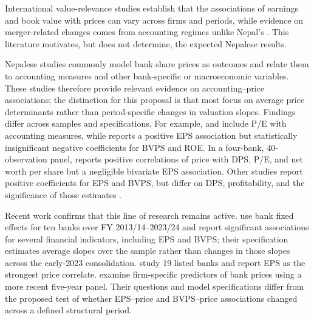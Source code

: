 International value-relevance studies establish that the associations of earnings and book value with prices can vary across firms and periods, while evidence on merger-related changes comes from accounting regimes unlike Nepal's \citep{collins1997,kwon2020}. This literature motivates, but does not determine, the expected Nepalese results.

Nepalese studies commonly model bank share prices as outcomes and relate them to accounting measures and other bank-specific or macroeconomic variables. These studies therefore provide relevant evidence on accounting--price associations; the distinction for this proposal is that most focus on average price determinants rather than period-specific changes in valuation slopes. Findings differ across samples and specifications. For example, \citet{bhattarai2014} and \citet{chhetri2023} include P/E with accounting measures, while \citet{niroula2021} reports a positive EPS association but statistically insignificant negative coefficients for BVPS and ROE. In a four-bank, 40-observation panel, \citet{giri2024} reports positive correlations of price with DPS, P/E, and net worth per share but a negligible bivariate EPS association. Other studies report positive coefficients for EPS and BVPS, but differ on DPS, profitability, and the significance of those estimates \citep{joshi2023,lamsal2024,gurung2024,pant2024,chaudhari2025}.

Recent work confirms that this line of research remains active. \citet{gurungdahal2025} use bank fixed effects for ten banks over FY 2013/14--2023/24 and report significant associations for several financial indicators, including EPS and BVPS; their specification estimates average slopes over the sample rather than changes in those slopes across the early-2023 consolidation. \citet{bhandari2026} study 19 listed banks and report EPS as the strongest price correlate. \citet{niraula2026} examine firm-specific predictors of bank prices using a more recent five-year panel. Their questions and model specifications differ from the proposed test of whether EPS--price and BVPS--price associations changed across a defined structural period.


